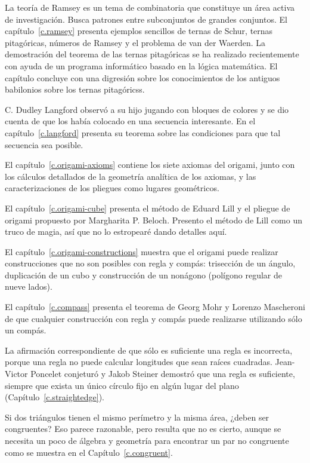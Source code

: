 La teoría de Ramsey es un tema de combinatoria que constituye un área activa de investigación. Busca patrones entre subconjuntos de grandes conjuntos. El capítulo~\ref{c.ramsey} presenta ejemplos sencillos de ternas de Schur, ternas pitagóricas, números de Ramsey y el problema de van der Waerden. La demostración del teorema de las ternas pitagóricas se ha realizado recientemente con ayuda de un programa informático basado en la lógica matemática. El capítulo concluye con una digresión sobre los conocimientos de los antiguos babilonios sobre los ternas pitagóricss.

C. Dudley Langford observó a su hijo jugando con bloques de colores y se dio cuenta de que los había colocado en una secuencia interesante. En el capítulo~\ref{c.langford} presenta su teorema sobre las condiciones para que tal secuencia sea posible.

El capítulo~\ref{c.origami-axioms} contiene los siete axiomas del origami, junto con los cálculos detallados de la geometría analítica de los axiomas, y las caracterizaciones de los pliegues como lugares geométricos.

El capítulo~\ref{c.origami-cube} presenta el método de Eduard Lill y el pliegue de origami propuesto por Margharita P. Beloch. Presento el método de Lill como un truco de magia, así que no lo estropearé dando detalles aquí.

El capítulo~\ref{c.origami-constructions} muestra que el origami puede realizar construcciones que no son posibles con regla y compás: trisección de un ángulo, duplicación de un cubo y construcción de un nonágono (polígono regular de nueve lados).

El capítulo~\ref{c.compass} presenta el teorema de Georg Mohr y Lorenzo Mascheroni de que cualquier construcción con regla y compás puede realizarse utilizando sólo un compás.

La afirmación correspondiente de que sólo es suficiente una regla es incorrecta, porque una regla no puede calcular longitudes que sean raíces cuadradas. Jean-Victor Poncelet conjeturó y Jakob Steiner demostró que una regla es suficiente, siempre que exista un único círculo fijo en algún lugar del plano (Capítulo~\ref{c.straightedge}).

Si dos triángulos tienen el mismo perímetro y la misma área, ¿deben ser congruentes? Eso parece razonable, pero resulta que no es cierto, aunque se necesita un poco de álgebra y geometría para encontrar un par no congruente como se muestra en el Capítulo~\ref{c.congruent}.

